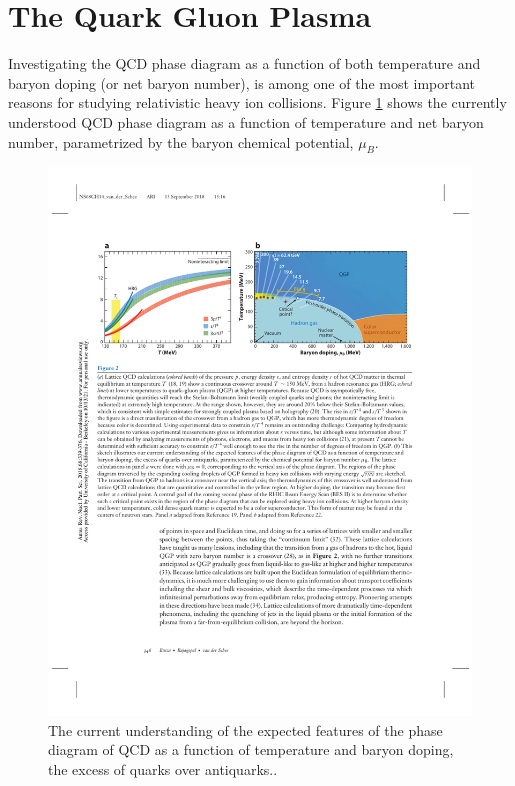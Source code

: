 \section{The Quark Gluon Plasma}\label{sec:QGP}

Investigating the QCD phase diagram as a function of both temperature and baryon doping (or net baryon number), is among one of the most important reasons for studying relativistic heavy ion collisions. Figure \ref{fig:qcd_phase} shows the currently understood QCD phase diagram as a function of temperature and net baryon number, parametrized by the baryon chemical potential, $\mu_B$.

\begin{figure}[htpb]
  \centering
  \includegraphics[width=.99\textwidth]{Introduction/qcd_phase.pdf}
  \caption{The current understanding of the expected features of the phase diagram of QCD as a function of temperature and baryon doping, the excess of quarks over antiquarks.\cite{annurev-nucl}.}
\label{fig:qcd_phase}
\end{figure}

